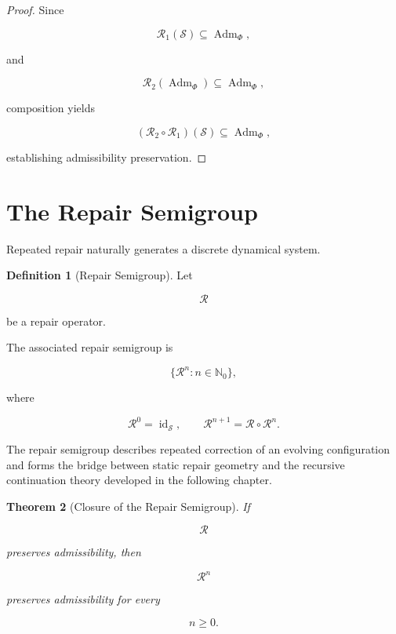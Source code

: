 \documentclass[11pt]{book}
\numberwithin{equation}{chapter}
\theoremstyle{definition}
\newtheorem{definition}{Definition}[chapter]
\theoremstyle{plain}
\newtheorem{theorem}[definition]{Theorem}
\begin{document}
\begin{proof}

Since

\[
\mathcal R_1
(\mathcal S)
\subseteq
\operatorname{Adm}_{\Phi},
\]

and

\[
\mathcal R_2
(
\operatorname{Adm}_{\Phi}
)
\subseteq
\operatorname{Adm}_{\Phi},
\]

composition yields

\[
(\mathcal R_2
\circ
\mathcal R_1)
(\mathcal S)
\subseteq
\operatorname{Adm}_{\Phi},
\]

establishing admissibility preservation.

\end{proof}

\section{The Repair Semigroup}

Repeated repair naturally generates a discrete dynamical system.

\begin{definition}[Repair Semigroup]

Let

\[
\mathcal R
\]

be a repair operator.

The associated repair semigroup is

\[
\{
\mathcal R^n
:
n\in\mathbb N_0
\},
\]

where

\[
\mathcal R^0
=
\operatorname{id}_{\mathcal S},
\qquad
\mathcal R^{n+1}
=
\mathcal R
\circ
\mathcal R^n.
\]

\end{definition}

The repair semigroup describes repeated correction of an evolving
configuration and forms the bridge between static repair geometry and
the recursive continuation theory developed in the following chapter.

\begin{theorem}[Closure of the Repair Semigroup]

If

\[
\mathcal R
\]

preserves admissibility, then

\[
\mathcal R^n
\]

preserves admissibility for every

\[
n\ge0.
\]

\end{theorem}
\end{document}
